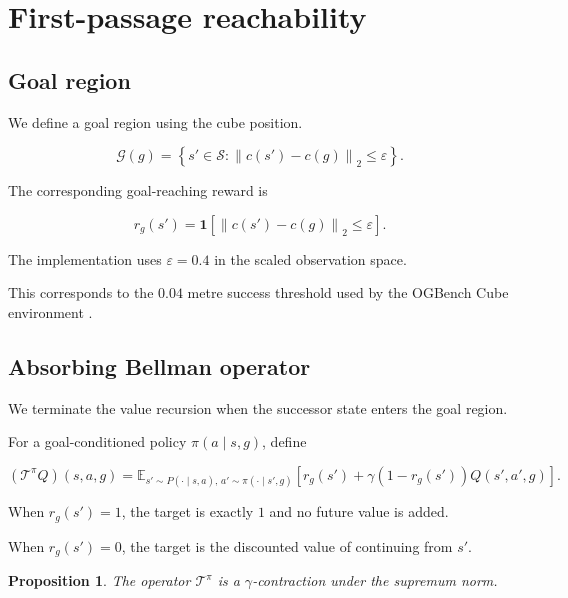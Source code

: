\documentclass[11pt]{article}
\newcommand{\E}{\mathbb{E}}
\newcommand{\one}{\mathbf{1}}
\newcommand{\norm}[1]{\left\lVert #1 \right\rVert}
\newtheorem{proposition}{Proposition}
\theoremstyle{remark}
\begin{document}
\section{First-passage reachability}

\subsection{Goal region}

We define a goal region using the cube position.

\begin{equation}
\mathcal G(g)=\left\{s'\in\mathcal S:\norm{c(s')-c(g)}_2\leq\varepsilon\right\}.
\label{eq:goal-set}
\end{equation}

The corresponding goal-reaching reward is

\begin{equation}
r_g(s')=\one\left[\norm{c(s')-c(g)}_2\leq\varepsilon\right].
\label{eq:hit-reward}
\end{equation}

The implementation uses $\varepsilon=0.4$ in the scaled observation space.

This corresponds to the $0.04$ metre success threshold used by the OGBench Cube environment \citep{park2025ogbench}.

\subsection{Absorbing Bellman operator}

We terminate the value recursion when the successor state enters the goal region.

For a goal-conditioned policy $\pi(a\mid s,g)$, define

\begin{equation}
(\mathcal T^\pi Q)(s,a,g)=\E_{s'\sim P(\cdot\mid s,a),\,a'\sim\pi(\cdot\mid s',g)}\left[r_g(s')+\gamma\left(1-r_g(s')\right)Q(s',a',g)\right].
\label{eq:operator}
\end{equation}

When $r_g(s')=1$, the target is exactly $1$ and no future value is added.

When $r_g(s')=0$, the target is the discounted value of continuing from $s'$.

\begin{proposition}
The operator $\mathcal T^\pi$ is a $\gamma$-contraction under the supremum norm.
\end{proposition}
\end{document}
